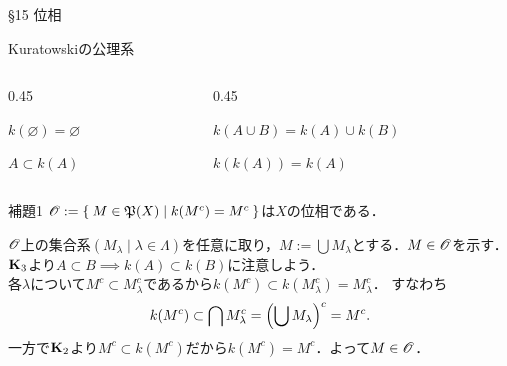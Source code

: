 \documentclass[uplatex,a4paper,dvipdfmx,aspectratio=169,11pt]{beamer}
\begin{document}
\begin{frame}[fragile]{\S 15 位相}
    \begin{block}{Kuratowskiの公理系}
        \vspace{-0.5em}
        \begin{columns}
            \begin{column}{0.45\textwidth}
                \begin{description}[$\textbf{K}_1$:]
                    \item[$\textbf{K}_1$:] $k(\varnothing) = \varnothing$
                    \item[$\textbf{K}_2$:] $A \subset k(A)$
                \end{description}
            \end{column}
            \begin{column}{0.45\textwidth}
                \begin{description}[$\textbf{K}_1$:]
                    \item[$\textbf{K}_3$:] $k(A \cup B) = k(A) \cup k(B)$
                    \item[$\textbf{K}_4$:] $k(k(A)) = k(A)$
                \end{description}
            \end{column}
        \end{columns}
    \end{block}

    \begin{block}{補題1}
        $\mathscr{O} := \Set{ M \in {\mathord{\mathfrak{P}}\qty(X)} | k(M^c) = M^c}$は$X$の位相である．
    \end{block}

    \medskip{}
    \begin{description}[$\textbf{O}_1$]
        \item[$\textbf{O}_3$:] $\mathscr{O}$上の集合系$(M_\lambda \mid \lambda \in \Lambda)$を任意に取り，$M := \bigcup M_\lambda$とする．$M \in \mathscr{O}$を示す．\\
            $\textbf{K}_3$より$A \subset B \implies k(A) \subset k(B)$に注意しよう．\\
            各$\lambda$について$M^c \subset M_\lambda^c$であるから$k(M^c) \subset k(M_\lambda^c) = M_\lambda^c$．
            すなわち\begin{equation*}k(M^c) \subset \bigcap M_\lambda^c = \qty(\bigcup M_\lambda)^c = M^c.\end{equation*}
            一方で$\textbf{K}_2$より$M^c \subset k(M^c)$だから$k(M^c) = M^c$．よって$M \in \mathscr{O}$．
    \end{description}
\end{frame}
\end{document}

